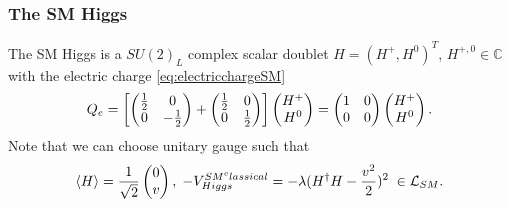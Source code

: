\subsubsection{The SM Higgs}
\label{subsubsec:higgsSM}
The SM Higgs is a $SU(2)_L$ complex scalar doublet $H= (H^+, H^0)^T$, $H^{+,0} \in \mathbb{C}$ with the electric charge \ref{eq:electricchargeSM}
\begin{equation}
	Q_e = \left[\begin{pmatrix}
	\frac{1}{2} &0 \\
	0 & - \frac{1}{2} \\
	\end{pmatrix} 
	+ \begin{pmatrix}
	\frac{1}{2} &0 \\
	0& \frac{1}{2} \\
	\end{pmatrix}\right]
	\begin{pmatrix}
	H^+ \\
	H^0 \\
	\end{pmatrix}
	= \begin{pmatrix}
	1 & 0 \\
	0& 0 \\
	\end{pmatrix}
	\begin{pmatrix}
	H^+ \\
	H^0\\
	\end{pmatrix}.
\end{equation}
Note that we can choose unitary gauge such that 
\begin{equation}
	\expval{H} = \frac{1}{\sqrt{2}} \begin{pmatrix}
	0 \\
	v\\ 
	\end{pmatrix}, \;
	-V^{SM^classical}_{Higgs} =- \lambda (H^\dagger H - \frac{v^2}{2} )^2\; \in \mathcal{L}_{SM}. 
\end{equation}
